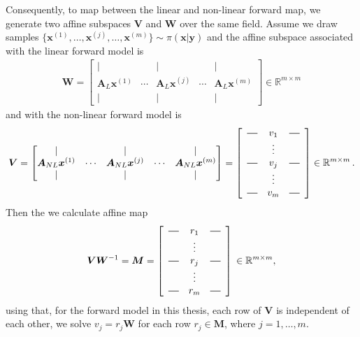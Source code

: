 Consequently, to map between the linear and non-linear forward map, we generate two affine subspaces $\bm{V}$ and $\bm{W}$ over the same field.
Assume we draw samples $\{\bm{x}^{(1)}, \dots, \bm{x}^{(j)}, \dots ,\bm{x}^{(m)}\} \sim \pi(\bm{x}|\bm{y})$ and the affine subspace associated with the linear forward model is \begin{align}
	\bm{W} = \begin{bmatrix}
		\vert&   &  \vert & & \vert \\
		\bm{A}_{L} \bm{x}^{(1)} &  \cdots& \bm{A}_{L} \bm{x}^{(j)} &  \cdots & \bm{A}_{L} \bm{x}^{(m)} \\
		\vert&   &  \vert & & \vert 
	\end{bmatrix}
\in \mathbb{R}^{m \times m}
\end{align} and with the non-linear forward model is 
\begin{align}
	\bm{V} = \begin{bmatrix}
		\vert&   &  \vert & & \vert \\
		\bm{A}_{NL}\bm{x}^{(1)} &  \cdots& \bm{A}_{NL}\bm{x}^{(j)} &  \cdots & \bm{A}_{NL} \bm{x}^{(m)}  \\
		\vert&   &  \vert & & \vert 
	\end{bmatrix} = 
		\begin{bmatrix}
	\begin{array}{ccc}
		\horzbar & v_{1} & \horzbar \\
		& \vdots    &          \\
		\horzbar & v_{j} & \horzbar \\
		& \vdots    &          \\
		\horzbar &v_{m} & \horzbar
	\end{array}
\end{bmatrix}\in \mathbb{R}^{m \times m} \, .
\end{align}
Then the we calculate affine map 
\begin{align}
	\bm{V}\bm{W}^{-1} = \bm{M} =
		\begin{bmatrix}
	\begin{array}{ccc}
		\horzbar & r_{1} & \horzbar \\
		& \vdots    &          \\
		\horzbar & r_{j} & \horzbar \\
		& \vdots    &          \\
		\horzbar &r_{m} & \horzbar
	\end{array}
\end{bmatrix}\, \in \mathbb{R}^{m \times m} ,
\end{align}
using that, for the forward model in this thesis, each row of $\bm{V}$ is independent of each other, we solve $v_j =r_j \bm{W} $ for each row $ r_j  \in \bm{M}$, where $j = 1, \dots, m$.



